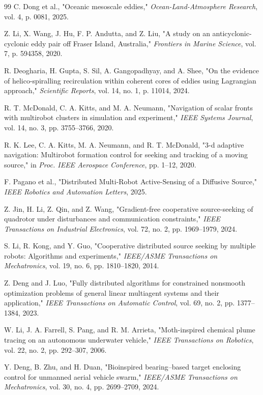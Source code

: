 \documentclass[12pt, letterpaper, oneside]{report}
\begin{document}
\begin{thebibliography}{99}
 C. Dong et al., "Oceanic mesoscale eddies," \textit{Ocean-Land-Atmosphere Research}, vol. 4, p. 0081, 2025.

 Z. Li, X. Wang, J. Hu, F. P. Andutta, and Z. Liu, "A study on an anticyclonic-cyclonic eddy pair off Fraser Island, Australia," \textit{Frontiers in Marine Science}, vol. 7, p. 594358, 2020.

 R. Deogharia, H. Gupta, S. Sil, A. Gangopadhyay, and A. Shee, "On the evidence of helico-spiralling recirculation within coherent cores of eddies using Lagrangian approach," \textit{Scientific Reports}, vol. 14, no. 1, p. 11014, 2024.

 R. T. McDonald, C. A. Kitts, and M. A. Neumann, "Navigation of scalar fronts with multirobot clusters in simulation and experiment," \textit{IEEE Systems Journal}, vol. 14, no. 3, pp. 3755--3766, 2020.

 R. K. Lee, C. A. Kitts, M. A. Neumann, and R. T. McDonald, "3-d adaptive navigation: Multirobot formation control for seeking and tracking of a moving source," in \textit{Proc. IEEE Aerospace Conference}, pp. 1--12, 2020.

 F. Pagano et al., "Distributed Multi-Robot Active-Sensing of a Diffusive Source," \textit{IEEE Robotics and Automation Letters}, 2025.

 Z. Jin, H. Li, Z. Qin, and Z. Wang, "Gradient-free cooperative source-seeking of quadrotor under disturbances and communication constraints," \textit{IEEE Transactions on Industrial Electronics}, vol. 72, no. 2, pp. 1969--1979, 2024.

 S. Li, R. Kong, and Y. Guo, "Cooperative distributed source seeking by multiple robots: Algorithms and experiments," \textit{IEEE/ASME Transactions on Mechatronics}, vol. 19, no. 6, pp. 1810--1820, 2014.

 Z. Deng and J. Luo, "Fully distributed algorithms for constrained nonsmooth optimization problems of general linear multiagent systems and their application," \textit{IEEE Transactions on Automatic Control}, vol. 69, no. 2, pp. 1377--1384, 2023.

 W. Li, J. A. Farrell, S. Pang, and R. M. Arrieta, "Moth-inspired chemical plume tracing on an autonomous underwater vehicle," \textit{IEEE Transactions on Robotics}, vol. 22, no. 2, pp. 292--307, 2006.

 Y. Deng, B. Zhu, and H. Duan, "Bioinspired bearing–based target enclosing control for unmanned aerial vehicle swarm," \textit{IEEE/ASME Transactions on Mechatronics}, vol. 30, no. 4, pp. 2699--2709, 2024.


\end{thebibliography}
\end{document}
